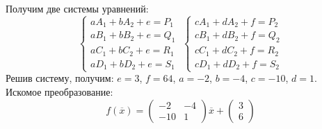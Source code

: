 \documentclass [a4paper,12pt]{article}
\begin{document}
Получим две системы уравнений:
\begin{equation*}
  \begin{cases}
  aA_1 + bA_2 + e = P_1\\
  aB_1 + bB_2 + e = Q_1\\
  aC_1 + bC_2 + e = R_1\\
  aD_1 + bD_2 + e = S_1
  \end{cases}
  \;
  \begin{cases}
  cA_1 + dA_2 + f = P_2\\
  cB_1 + dB_2 + f = Q_2\\
  cC_1 + dC_2 + f = R_2\\
  cD_1 + dD_2 + f = S_2
  \end{cases}
\end{equation*}
Решив систему, получим: $e=3$, $f=64$, $a= -2$, $b=-4$, $c=-10$, $d=1$.\\
Искомое преобразование:\\
\begin{equation*}
f({\overline{x}})=\begin{pmatrix}
-2 & -4\\
-10 & 1
\end{pmatrix}{\overline{x}} +
\begin{pmatrix}
3\\
6
\end{pmatrix}
\end{equation*}
\end{document}
